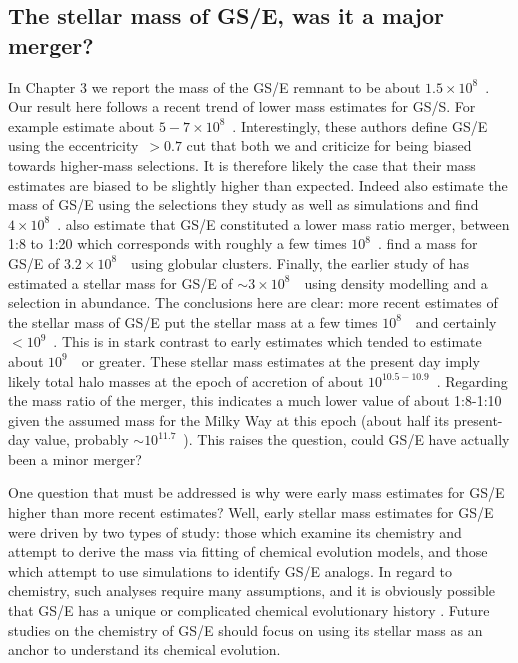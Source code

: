 \subsection{The stellar mass of GS/E, was it a major merger?}

In Chapter 3 we report the mass of the GS/E remnant to be about $1.5\times10^{8}$~\Msun. Our result here follows a recent trend of lower mass estimates for GS/S. For example \textcite{han22} estimate about $5-7\times10^{8}$~\Msun. Interestingly, these authors define GS/E using the eccentricity~$> 0.7$ cut that both we and \textcite{carrillo23} criticize for being biased towards higher-mass selections. It is therefore likely the case that their mass estimates are biased to be slightly higher than expected. Indeed \textcite{carrillo23} also estimate the mass of GS/E using the selections they study as well as simulations and find $4\times10^{8}$~\Msun. \textcite{rey23} also estimate that GS/E constituted a lower mass ratio merger, between 1:8 to 1:20 which corresponds with roughly a few times $10^{8}$~\Msun. \textcite{callingham22} find a mass for GS/E of $3.2\times10^{8}$~\Msun\ using globular clusters. Finally, the earlier study of \textcite{mackereth20} has estimated a stellar mass for GS/E of $\sim 3\times10^{8}$~\Msun\ using density modelling and a selection in abundance. The conclusions here are clear: more recent estimates of the stellar mass of GS/E put the stellar mass at a few times $10^{8}$~\Msun\ and certainly $< 10^{9}$~\Msun. This is in stark contrast to early estimates which tended to estimate about $10^{9}$~\Msun\ or greater. These stellar mass estimates at the present day imply likely total halo masses at the epoch of accretion of about $10^{10.5-10.9}$~\Msun. Regarding the mass ratio of the merger, this indicates a much lower value of about 1:8-1:10 given the assumed mass for the Milky Way at this epoch (about half its present-day value, probably $\sim 10^{11.7}$~\Msun). This raises the question, could GS/E have actually been a minor merger?

One question that must be addressed is why were early mass estimates for GS/E higher than more recent estimates? Well, early stellar mass estimates for GS/E were driven by two types of study: those which examine its chemistry and attempt to derive the mass via fitting of chemical evolution models, and those which attempt to use simulations to identify GS/E analogs. In regard to chemistry, such analyses require many assumptions, and it is obviously possible that GS/E has a unique or complicated chemical evolutionary history \parencite[e.g. as argued by][]{matsuno21,sanders21}. Future studies on the chemistry of GS/E should focus on using its stellar mass as an anchor to understand its chemical evolution. 

